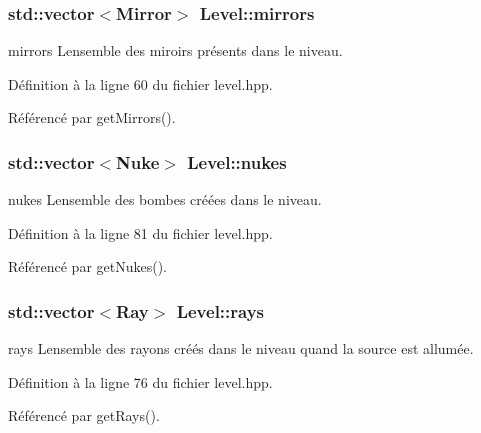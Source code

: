 \subsubsection[{mirrors}]{\setlength{\rightskip}{0pt plus 5cm}std\+::vector$<${\bf Mirror}$>$ Level\+::mirrors\hspace{0.3cm}{\ttfamily [private]}}\label{classLevel_acdc507d55f78548739af4988d2af3647}


mirrors L\textquotesingle{}ensemble des miroirs présents dans le niveau. 



Définition à la ligne 60 du fichier level.\+hpp.



Référencé par get\+Mirrors().

\hypertarget{classLevel_a5fece1ffe87935a190ed156456ce410b}{}
\subsubsection[{nukes}]{\setlength{\rightskip}{0pt plus 5cm}std\+::vector$<${\bf Nuke}$>$ Level\+::nukes\hspace{0.3cm}{\ttfamily [private]}}\label{classLevel_a5fece1ffe87935a190ed156456ce410b}


nukes L\textquotesingle{}ensemble des bombes créées dans le niveau. 



Définition à la ligne 81 du fichier level.\+hpp.



Référencé par get\+Nukes().

\hypertarget{classLevel_a316fd189c069c2645f07be3862dc2caf}{}
\subsubsection[{rays}]{\setlength{\rightskip}{0pt plus 5cm}std\+::vector$<${\bf Ray}$>$ Level\+::rays\hspace{0.3cm}{\ttfamily [private]}}\label{classLevel_a316fd189c069c2645f07be3862dc2caf}


rays L\textquotesingle{}ensemble des rayons créés dans le niveau quand la source est allumée. 



Définition à la ligne 76 du fichier level.\+hpp.



Référencé par get\+Rays().

